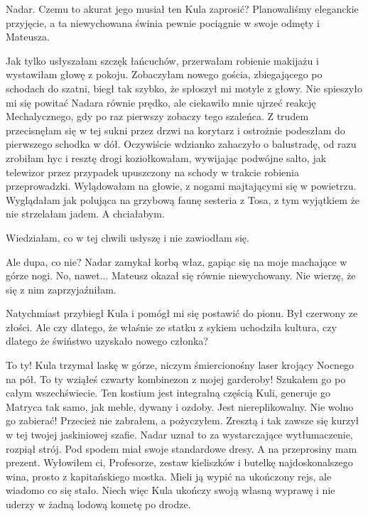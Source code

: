 Nadar. Czemu to akurat jego musiał ten Kula zaprosić?
Planowaliśmy eleganckie przyjęcie, a ta niewychowana świnia pewnie pociągnie w swoje odmęty i Mateusza.

Jak tylko usłyszałam szczęk łańcuchów, przerwałam robienie makijażu i wystawiłam głowę z pokoju.
Zobaczyłam nowego gościa, zbiegającego po schodach do szatni, biegł tak szybko, że spłoszył mi motyle z głowy.
Nie spieszyło mi się powitać Nadara równie prędko, ale ciekawiło mnie ujrzeć reakcję Mechalycznego, gdy po raz pierwszy zobaczy tego szaleńca.
Z trudem przecisnęłam się w tej sukni przez drzwi na korytarz i ostrożnie podeszłam do pierwszego schodka w dół.
Oczywiście wdzianko zahaczyło o balustradę, od razu zrobiłam hyc i resztę drogi koziołkowałam, 
wywijając podwójne salto, jak telewizor przez przypadek upuszczony na schody w trakcie robienia przeprowadzki.
Wylądowałam na głowie, z nogami majtającymi się w powietrzu.
Wyglądałam jak polująca na grzybową faunę sesteria z Tosa, z tym wyjątkiem że nie strzelałam jadem. A chciałabym.

Wiedziałam, co w tej chwili usłyszę i nie zawiodłam się.

\begin{dialogue}
\ds{} Ale dupa, co nie? \dm{} Nadar zamykał korbą właz, gapiąc się na moje machające w górze nogi.
\ds{} No, nawet... \dm{} Mateusz okazał się równie niewychowany. Nie wierzę, że się z nim zaprzyjaźniłam.
\end{dialogue}

Natychmiast przybiegł Kula i pomógł mi się postawić do pionu. Był czerwony ze złości.
Ale czy dlatego, że właśnie ze statku z sykiem uchodziła kultura, czy dlatego że świństwo uzyskało nowego członka?

\begin{dialogue}
\ds{} To ty! \dm{} Kula trzymał laskę w górze, niczym śmiercionośny laser krojący Nocnego na pół. \dm{} 
To ty wziąłeś czwarty kombinezon z mojej garderoby! 
Szukałem go po całym wszechświecie. Ten kostium jest integralną częścią Kuli, generuje go Matryca tak samo, jak meble, dywany i ozdoby.
Jest niereplikowalny. Nie wolno go zabierać!
\ds{} Przecież nie zabrałem, a pożyczyłem. Zresztą i tak zawsze się kurzył w tej twojej jaskiniowej szafie. \dm{}
Nadar uznał to za wystarczające wytłumaczenie, rozpiął strój. Pod spodem miał swoje standardowe dresy. \dm{} 
A na przeprosiny mam prezent. Wyłowiłem ci, Profesorze, zestaw kieliszków i butelkę najdoskonalszego wina, prosto z kapitańskiego mostka.
Mieli ją wypić na ukończony rejs, ale wiadomo co się stało. Niech więc Kula ukończy swoją własną wyprawę i nie uderzy w żadną lodową kometę po drodze.
\end{dialogue}

